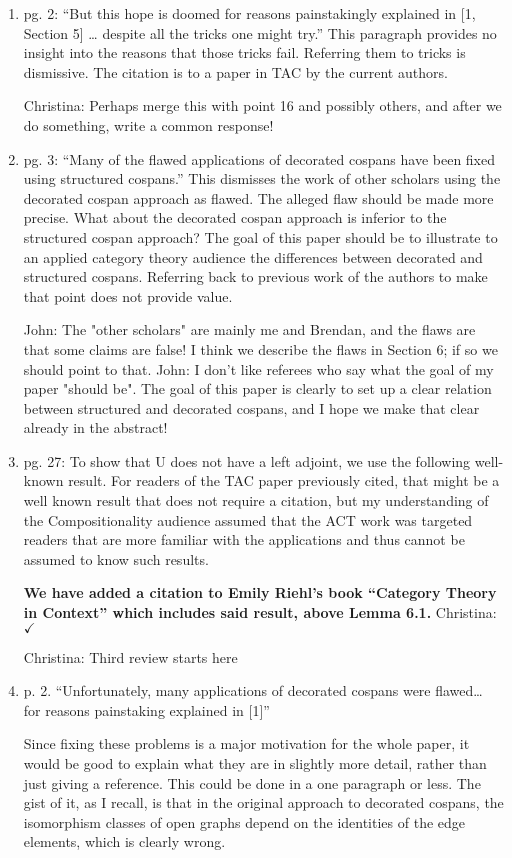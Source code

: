 \documentclass[reqno]{amsart}
\def\chris{\color{purple} Christina: }
\def\john{\color{red} John: }
\begin{document}
\begin{enumerate}
\item pg. 2: “But this hope is doomed for reasons painstakingly explained in [1, Section 5] … despite all the tricks one might try.” This paragraph 
provides 
no insight into the reasons that those tricks fail. Referring them to tricks is dismissive. The citation is to a paper in TAC by the current authors.

{\chris Perhaps merge this with point 16 and possibly others, and after we do something, write a common response!}

\item pg. 3: “Many of the flawed applications of decorated cospans have been fixed using structured cospans.” This dismisses the work of other 
scholars 
using the decorated cospan approach as flawed. The alleged flaw should be made more precise. What about the decorated cospan approach is inferior to 
the structured cospan approach? The goal of this paper should be to illustrate to an applied category theory audience the differences between 
decorated and structured cospans. Referring back to previous work of the authors to make that point does not provide value.

{\john The "other scholars" are mainly me and Brendan, and the flaws are that some claims are false! I think we describe the flaws in Section 6; if so 
we should point to that.}
{\john I don't like referees who say what the goal of my paper "should be". The goal of this paper is clearly to set up a clear relation between 
structured and decorated cospans, and I hope we make that clear already in the abstract!}

\item pg. 27: To show that U does not have a left adjoint, we use the following well-known result. For readers of the TAC paper previously cited, 
that might 
be a well known result that does not require a citation, but my understanding of the Compositionality audience assumed that the ACT work was targeted 
readers that are more familiar with the applications and thus cannot be assumed to know such results.

{\bf We have added a citation to Emily Riehl's book ``Category Theory in Context'' which includes said result, above Lemma 6.1.} {\chris $\checkmark$}

{\chris Third review starts here}
\item p. 2. “Unfortunately, many applications of decorated cospans were flawed… for reasons painstaking explained in [1]”

Since fixing these problems is a major motivation for the whole paper, it would be good to explain what they are in slightly more detail, rather than 
just giving a reference. This could be done in a one paragraph or less. The gist of it, as I recall, is that in the original approach to decorated 
cospans, the isomorphism classes of open graphs depend on the identities of the edge elements, which is clearly wrong.


\end{enumerate}
\end{document}
